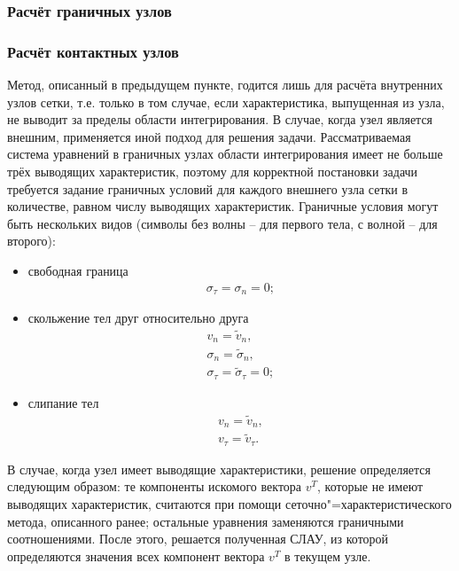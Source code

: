 \subsubsection{Расчёт граничных узлов}


\subsubsection{Расчёт контактных узлов}

Метод, описанный в предыдущем пункте, годится лишь для расчёта внутренних узлов
сетки, т.е. только в том случае, если характеристика, выпущенная из узла, не
выводит за пределы области интегрирования. В случае, когда узел является
внешним, применяется иной подход для решения задачи. Рассматриваемая система
уравнений в граничных узлах области интегрирования имеет не больше трёх
\cite{chelnokov} выводящих характеристик, поэтому для корректной постановки
задачи требуется задание граничных условий для каждого внешнего узла сетки в
количестве, равном числу выводящих характеристик. Граничные условия могут быть
нескольких видов (символы без волны -- для первого тела, с волной -- для второго):
\begin{itemize}
\item{свободная граница
\begin{eqnarray}
\sigma_\tau=\sigma_n=0; \nonumber
\end{eqnarray}}
\item{скольжение тел друг относительно друга 
\begin{eqnarray}
v_n=\tilde{v}_n,\nonumber\\
\sigma_n=\tilde{\sigma}_n,\nonumber\\
\sigma_\tau=\tilde{\sigma}_\tau=0; \nonumber
\end{eqnarray}}
\item{слипание тел
\begin{eqnarray}
v_n=\tilde{v}_n,\nonumber\\
v_\tau=\tilde{v}_\tau.
\end{eqnarray}}
\end{itemize}
В случае, когда узел имеет выводящие характеристики, решение определяется
следующим образом: те компоненты искомого вектора $v^T$, которые не имеют
выводящих характеристик, считаются при помощи сеточно"=характеристического
метода, описанного ранее; остальные уравнения заменяются граничными
соотношениями. После этого, решается полученная СЛАУ, из которой определяются
значения всех компонент вектора $v^T$ в текущем узле.



